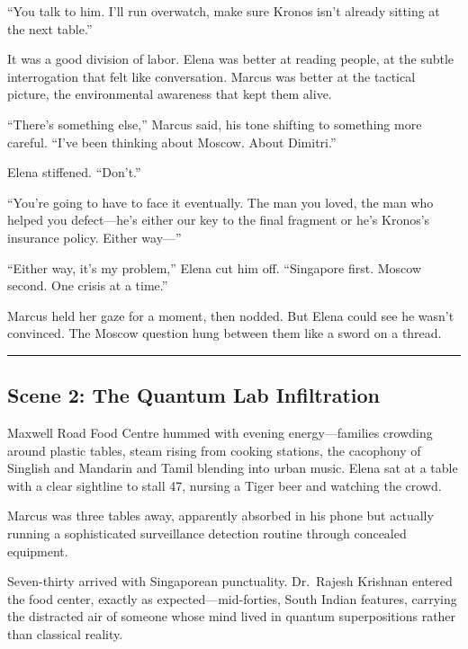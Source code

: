 ``You talk to him. I'll run overwatch, make sure Kronos isn't already
sitting at the next table.''

It was a good division of labor. Elena was better at reading people, at
the subtle interrogation that felt like conversation. Marcus was better
at the tactical picture, the environmental awareness that kept them
alive.

``There's something else,'' Marcus said, his tone shifting to something
more careful. ``I've been thinking about Moscow. About Dimitri.''

Elena stiffened. ``Don't.''

``You're going to have to face it eventually. The man you loved, the man
who helped you defect---he's either our key to the final fragment or
he's Kronos's insurance policy. Either way---''

``Either way, it's my problem,'' Elena cut him off. ``Singapore first.
Moscow second. One crisis at a time.''

Marcus held her gaze for a moment, then nodded. But Elena could see he
wasn't convinced. The Moscow question hung between them like a sword on
a thread.

\begin{center}\rule{0.5\linewidth}{0.5pt}\end{center}

\hypertarget{scene-2-the-quantum-lab-infiltration}{%
\subsection{Scene 2: The Quantum Lab
Infiltration}\label{scene-2-the-quantum-lab-infiltration}}

Maxwell Road Food Centre hummed with evening energy---families crowding
around plastic tables, steam rising from cooking stations, the cacophony
of Singlish and Mandarin and Tamil blending into urban music. Elena sat
at a table with a clear sightline to stall 47, nursing a Tiger beer and
watching the crowd.

Marcus was three tables away, apparently absorbed in his phone but
actually running a sophisticated surveillance detection routine through
concealed equipment.

Seven-thirty arrived with Singaporean punctuality. Dr.~Rajesh Krishnan
entered the food center, exactly as expected---mid-forties, South Indian
features, carrying the distracted air of someone whose mind lived in
quantum superpositions rather than classical reality.


